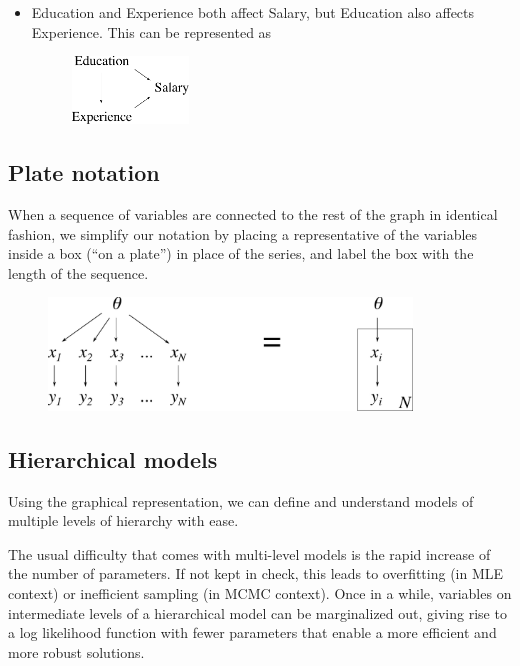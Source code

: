 \begin{itemize}
	\item Education and Experience both affect Salary, but Education also affects Experience. This can be represented as
	\begin{figure}[h!]
	\centering
		\includegraphics[height=18mm]{./figs/04-education-salary.pdf} 
	\end{figure}
\end{itemize}

\subsection{Plate notation}
When a sequence of variables are connected to the rest of the graph in identical fashion, we simplify our notation by placing a representative of the variables inside a box (``on a plate'') in place of the series, and label the box with the length of the sequence.
\begin{figure}[h!]
\centering
	\includegraphics[height=30mm]{./figs/04-plate-notation.pdf}
\end{figure}

\newpage
\subsection{Hierarchical models}
Using the graphical representation, we can define and understand models of multiple levels of hierarchy with ease. 

The usual difficulty that comes with multi-level models is the rapid increase of the number of parameters. If not kept in check, this leads to overfitting (in MLE context) or inefficient sampling (in MCMC context). Once in a while, variables on intermediate levels of a hierarchical model can be marginalized out, giving rise to a log likelihood function with fewer parameters that enable a more efficient and more robust solutions.
\\


